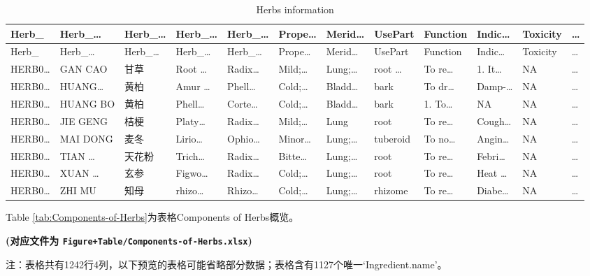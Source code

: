 \documentclass[
]{article}
\begin{document}
\begin{longtable}[]{@{}llllllllllll@{}}
\caption{\label{tab:Herbs-information}Herbs information}\tabularnewline
\toprule
Herb\_ & Herb\_\ldots{} & Herb\_\ldots{} & Herb\_\ldots{} & Herb\_\ldots{} & Prope\ldots{} & Merid\ldots{} & UsePart & Function & Indic\ldots{} & Toxicity & \ldots{}\tabularnewline
\midrule
\endfirsthead
\toprule
Herb\_ & Herb\_\ldots{} & Herb\_\ldots{} & Herb\_\ldots{} & Herb\_\ldots{} & Prope\ldots{} & Merid\ldots{} & UsePart & Function & Indic\ldots{} & Toxicity & \ldots{}\tabularnewline
\midrule
\endhead
HERB0\ldots{} & GAN CAO & 甘草 & Root \ldots{} & Radix\ldots{} & Mild;\ldots{} & Lung;\ldots{} & root \ldots{} & To re\ldots{} & 1. It\ldots{} & NA & \ldots{}\tabularnewline
HERB0\ldots{} & HUANG\ldots{} & 黄柏 & Amur \ldots{} & Phell\ldots{} & Cold;\ldots{} & Bladd\ldots{} & bark & To dr\ldots{} & Damp-\ldots{} & NA & \ldots{}\tabularnewline
HERB0\ldots{} & HUANG BO & 黄柏 & Phell\ldots{} & Corte\ldots{} & Cold;\ldots{} & Bladd\ldots{} & bark & 1. To\ldots{} & NA & NA & \ldots{}\tabularnewline
HERB0\ldots{} & JIE GENG & 桔梗 & Platy\ldots{} & Radix\ldots{} & Mild;\ldots{} & Lung & root & To re\ldots{} & Cough\ldots{} & NA & \ldots{}\tabularnewline
HERB0\ldots{} & MAI DONG & 麦冬 & Lirio\ldots{} & Ophio\ldots{} & Minor\ldots{} & Lung;\ldots{} & tuberoid & To no\ldots{} & Angin\ldots{} & NA & \ldots{}\tabularnewline
HERB0\ldots{} & TIAN \ldots{} & 天花粉 & Trich\ldots{} & Radix\ldots{} & Bitte\ldots{} & Lung;\ldots{} & root & To re\ldots{} & Febri\ldots{} & NA & \ldots{}\tabularnewline
HERB0\ldots{} & XUAN \ldots{} & 玄参 & Figwo\ldots{} & Radix\ldots{} & Cold;\ldots{} & Lung;\ldots{} & root & To re\ldots{} & Heat \ldots{} & NA & \ldots{}\tabularnewline
HERB0\ldots{} & ZHI MU & 知母 & rhizo\ldots{} & Rhizo\ldots{} & Cold;\ldots{} & Lung;\ldots{} & rhizome & To re\ldots{} & Diabe\ldots{} & NA & \ldots{}\tabularnewline
\bottomrule
\end{longtable}

Table \ref{tab:Components-of-Herbs}为表格Components of Herbs概览。

\textbf{(对应文件为 \texttt{Figure+Table/Components-of-Herbs.xlsx})}

\begin{center}\begin{tcolorbox}[colback=gray!10, colframe=gray!50, width=0.9\linewidth, arc=1mm, boxrule=0.5pt]注：表格共有1242行4列，以下预览的表格可能省略部分数据；表格含有1127个唯一`Ingredient.name'。
\end{tcolorbox}
\end{center}
\end{document}
